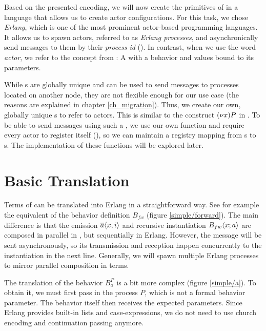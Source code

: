 Based on the presented encoding,
we will now create the primitives of \corejoincalc
in a language that allows us to create actor configurations.
For this task, we chose \emph{Erlang},
which is one of the most prominent actor-based programming languages.
It allows us to spawn actors, referred to as \emph{Erlang processes},
and asynchronically send messages to them by their \emph{process id} (\PID).
In contrast, when we use the word \emph{actor},
we refer to the concept from \actorpicalc:
A \actorname with a behavior and values bound to its parameters.


While \PID{}s are globally unique and can be used to send messages to
processes located on another node,
they are not flexible enough for our use case
(the reasons are explained in chapter \ref{ch_migration}).
Thus, we create our own, globally unique \actorname{}s to refer to actors.
This is similar to the construct $\anew{x}{P}$ in \actorpicalc.
To be able to send messages using such a \actorname,
we use our own  function and require every actor to register itself
(),
so we can maintain a registry mapping from \actorname{}s to \PID{}s.
The implementation of these functions will be explored later.


\section{Basic Translation}
\label{implementation_basic}

Terms of \actorpicalc can be translated into Erlang in a straightforward way.
See for example the equivalent of the behavior definition $B_{fw}$
(figure \ref{simple/forward}).
The main difference is that the emission $\overline{a}\langle x,i\rangle$
and recursive instantiation $B_{fw} \langle x ; a \rangle$
are composed in parallel in \actorpicalc,
but sequentially in Erlang.
However, the message will be sent asynchronously,
so its transmission and reception happen concurrently to the instantiation
in the next line.
Generally, we will spawn multiple Erlang processes to
mirror parallel composition in \actorpicalc terms.


The translation of the behavior $B_a^P$ is a bit more complex
(figure \ref{simple/a}).
To obtain it, we must first pass in the process $P$,
which is not a formal behavior parameter.
The behavior itself then receives the expected parameters.
Since Erlang provides built-in lists and case-expressions,
we do not need to use church encoding and continuation passing anymore.

